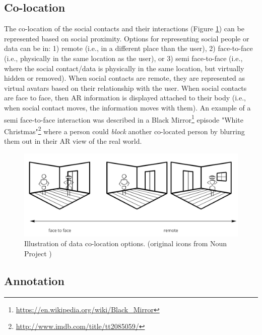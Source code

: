\subsection{Co-location}


The co-location of the social contacts and their interactions (Figure \ref{fig:continuum:data-colocation}) can be represented based on social proximity. Options for representing social people or data can be in: 
1) remote (i.e., in a different place than the user), 
2) face-to-face (i.e., physically in the same location as the user), or 
3) semi face-to-face (i.e., where the social contact/data is physically in the same location, but virtually hidden or removed). When social contacts are remote, they are represented as virtual avatars based on their relationship with the user. When social contacts are face to face, then AR information is displayed attached to their body (i.e., when social contact moves, the information moves with them). 
An example of a semi face-to-face interaction was described in a Black Mirror\footnote{\url{https://en.wikipedia.org/wiki/Black_Mirror}} episode "White Christmas"\footnote{\url{http://www.imdb.com/title/tt2085059/}} where a person could \textit{block} another co-located person by blurring them out in their AR view of the real world.

\begin{figure}[ht]
    \centering
    \includegraphics[width=0.8\linewidth]{images/30-continuum/continuum-colocation.jpg}
    \caption{Illustration of data co-location options. (original icons from Noun Project \cite{TheNounProjectInc.})}
    \label{fig:continuum:data-colocation}
\end{figure}

\subsection{Annotation}

